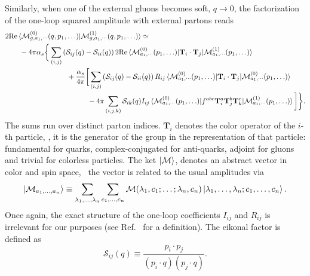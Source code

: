 Similarly, when one of the external gluons becomes soft, $q \rightarrow 0$, the factorization of the one-loop squared amplitude with external partons reads
\begin{equation}
\begin{split}
&2 \text{Re} \braket{\mathcal{M}^{(0)}_{g,a_1,\cdots} (q, p_1, \ldots)|\mathcal{M}^{(1)}_{g,a_1,\cdots} (q, p_1, \ldots)} \simeq \\
&\qquad - 4 \pi \alphas \bigg \lbrace \sum_{(i,j)} \left( \mathcal{S}_{ij}(q) - \mathcal{S}_{ii}(q) \right) 2 \text{Re} \braket{\mathcal{M}^{(0)}_{a_1,\cdots} ( p_1, \ldots)| \mathbf{T}_i \cdot \mathbf{T}_j|\mathcal{M}^{(1)}_{a_1,\cdots} (p_1, \ldots)}  \\
& \hspace{3cm} + \frac{\alphas}{4 \pi} \bigg [ \sum_{(i,j)} \left( \mathcal{S}_{ij}(q) - \mathcal{S}_{ii}(q) \right) R_{ij} \braket{\mathcal{M}^{(0)}_{a_1,\cdots} ( p_1, \ldots)| \mathbf{T}_i \cdot \mathbf{T}_j|\mathcal{M}^{(0)}_{a_1,\cdots} (p_1, \ldots)}  \\
& \hspace{4cm}  - 4 \pi \sum_{(i,j,k)} \mathcal{S}_{ik} (q) I_{ij} \braket{\mathcal{M}^{(0)}_{a_1,\cdots} ( p_1, \ldots)| f^{abc} \mathbf{T}_i^a \mathbf{T}_j^b \mathbf{T}_k^c|\mathcal{M}^{(1)}_{a_1,\cdots} (p_1, \ldots)} \bigg ] \bigg \rbrace .
\end{split}
\label{eq:5:soft_limit}
\end{equation}
The sums run over distinct parton indices. $\mathbf{T}_i$ denotes the color operator of the $i$-th particle, \ie, it is the generator of the  group in the representation of that particle: fundamental for quarks, complex-conjugated for anti-quarks, adjoint for gluons and trivial for colorless particles. The ket $\ket{\mathcal{M}}$, denotes an abstract vector in color and spin space, \ie\ the vector is related to the usual amplitudes via
\begin{equation}
\ket{\mathcal{M}_{a_1,\ldots , a_n}} \equiv \sum_{\lambda_1, \ldots , \lambda_n} \sum_{c_1, \ldots , c_n} \mathcal{M} (\lambda_1, c_1; \ldots ; \lambda_n, c_n) \ket{\lambda_1, \ldots , \lambda_n ; c_1, \ldots , c_n}.
\end{equation}
Once again, the exact structure of the one-loop coefficients $I_{ij}$ and $R_{ij}$ is irrelevant for our purposes (see Ref.~\cite{Czakon:2014oma} for a definition). The eikonal factor is defined as
\begin{equation}
\mathcal{S}_{ij}(q) \equiv \frac{p_i \cdot p_j}{(p_i \cdot q) (p_j \cdot q)}.
\end{equation}


